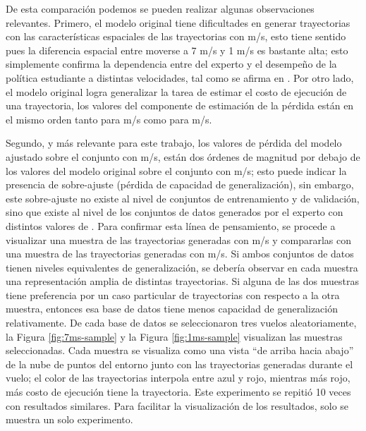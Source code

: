 De esta comparación podemos se pueden realizar algunas observaciones relevantes. Primero, el modelo original tiene dificultades en generar trayectorias con las características espaciales de las trayectorias con  m/s, esto tiene sentido pues la diferencia espacial entre moverse a 7 m/s y 1 m/s es bastante alta; esto simplemente confirma la dependencia entre  del experto y el desempeño de la política estudiante a distintas velocidades, tal como se afirma en \cite{Loquercio2021}. Por otro lado, el modelo original logra generalizar la tarea de estimar el costo de ejecución de una trayectoria, los valores del componente de estimación de la pérdida están en el mismo orden tanto para  m/s como para  m/s. 

Segundo, y más relevante para este trabajo, los valores de pérdida del modelo ajustado sobre el conjunto con  m/s, están dos órdenes de magnitud por debajo de los valores del modelo original sobre el conjunto con  m/s; esto puede indicar la presencia de sobre-ajuste (pérdida de capacidad de generalización), sin embargo, este sobre-ajuste no existe al nivel de conjuntos de entrenamiento y de validación, sino que existe al nivel de los conjuntos de datos generados por el experto con distintos valores de . Para confirmar esta línea de pensamiento, se procede a visualizar una muestra de las trayectorias generadas con  m/s y compararlas con una muestra de las trayectorias generadas con  m/s. Si ambos conjuntos de datos tienen niveles equivalentes de generalización, se debería observar en cada muestra una representación amplia de distintas trayectorias. Si alguna de las dos muestras tiene preferencia por un caso particular de trayectorias con respecto a la otra muestra, entonces esa base de datos tiene menos capacidad de generalización relativamente. De cada base de datos se seleccionaron tres vuelos aleatoriamente, la Figura \ref{fig:7ms-sample} y la Figura \ref{fig:1ms-sample} visualizan las muestras seleccionadas. Cada muestra se visualiza como una vista ``de arriba hacia abajo'' de la nube de puntos del entorno junto con las trayectorias generadas durante el vuelo; el color de las trayectorias interpola entre azul y rojo, mientras más rojo, más costo de ejecución tiene la trayectoria. Este experimento se repitió 10 veces con resultados similares. Para facilitar la visualización de los resultados, solo se muestra un solo experimento.

